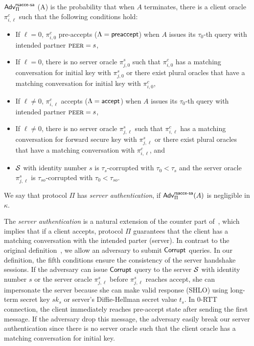 \begin{definition} \label{def:rsacce-sa}
 $\mathsf{Adv}^{\mathsf{rsacce\textsc{-} sa}}_{\Pi}$ (A) is the probability that when
 $A$ terminates, there is a client oracle $\pi^c_{i, \ell}$
 such that the following conditions hold:
 \begin{itemize}
  \item{If $\ell = 0$, $\pi^c_{i, 0}$ pre-accepts
  ($\Lambda = \mathsf{preaccept}$) when $A$ issues its
  $\tau_0$-th query with intended partner $\textsc{peer}=s$, }

  \item{If $\ell = 0$, there is no server oracle
  $\pi^s_{j, 0}$ such
  that $\pi^c_{i,0}$ has a matching conversation for initial
  key with
  $\pi^s_{j,0}$ or there exist plural oracles that have
  a matching conversation for initial key with $\pi^c_{i,0}$,}

  \item{If $\ell \neq 0$, $\pi^c_{i, \ell}$
  accepts ($\Lambda = \mathsf{accept}$) when $A$ issues its
  $\tau_0$-th query with intended partner $\textsc{peer}=s$, }

  \item{If $\ell \neq 0$, there is no server oracle
  $\pi^s_{j, \ell}$ such
  that $\pi^c_{i,\ell}$ has a matching conversation for forward
  secure key with
  $\pi^s_{j,\ell}$ or there exist plural oracles that have
  a matching conversation with $\pi^c_{i,\ell}$, and}

  \item{$\mathcal{S}$ with identity number $s$ is $\tau_{s}$-corrupted with
  $\tau_0 < \tau_{s}$ and the server oracle $\pi^s_{j, \ell}$ is
  $\tau_{so}$-corrupted with $\tau_0 < \tau_{so}$. }

 \end{itemize}
 We say that protocol $\Pi$ has \textit{server authentication},
 if $\mathsf{Adv}^{\mathsf{rsacce\textsc{-} sa}}_{\Pi}(A)$ is negligible in $\kappa$.
\end{definition}

\begin{remark}
 The \textit{server authentication} is a natural extension
 of the counter part of~\cite{KPW13:SACCE}, which implies
 that if a client accepts, protocol $\Pi$ guarantees that
 the client has a matching conversation with the intended
 parter (server). In contrast to the original
 definition~\cite{KPW13:SACCE}, we allow an adversary to
 submit $\mathsf{Corrupt}$ queries.
 In our definition, the fifth conditions ensure the
 consistency of the server handshake sessions.
 If the adversary can issue $\mathsf{Corrupt}$ query to the server
 $\mathcal{S}$ with identity number $s$ or the server oracle $\pi^s_{j, \ell}$
 before $\pi^s_{j, \ell}$ reaches accept, she can
 impersonate the server because she can make valid response
 (SHLO) using long-term secret key $sk_s$ or server's
 Diffie-Hellman secret value $t_s$.
 In 0-RTT connection, the client immediately reaches pre-accept state
 after sending the first message. If the adversary drop this message, the adversary
 easily break our server authentication since there is no server oracle
 such that the client oracle has a matching conversation for initial key.

 \end{remark}

